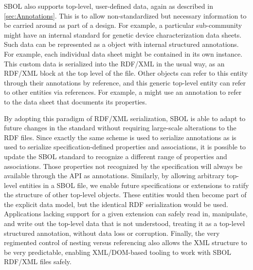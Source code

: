 SBOL also supports top-level, user-defined data, again as described in \ref{sec:Annotations}. This is to allow non-standardized but necessary information to be carried around as part of a design. For example, a particular sub-community might have an internal standard for genetic device characterization data sheets. 
Such data can be represented as a  object with internal structured annotations. 
For example, each individual data sheet might be contained in its own  instance.
This custom data is serialized into the RDF/XML in the usual way, as an RDF/XML block at the top level of the file. 
Other objects can refer to this entity through their annotations by reference, and this generic top-level entity can refer to other entities via references.
For example, a  might use an annotation to refer to the data sheet  that documents its properties.

By adopting this paradigm of RDF/XML serialization, SBOL is able to adapt to future changes in the standard without requiring large-scale alterations to the RDF files. Since exactly the same scheme is used to serialize annotations as is used to serialize specification-defined properties and associations, it is possible to update the SBOL standard to recognize a different range of properties and associations. Those properties not recognized by the specification will always be available through the API as annotations. Similarly, by allowing arbitrary top-level entities in a SBOL file, we enable future specifications or extensions to ratify the structure of other top-level objects. These entities would then become part of the explicit data model, but the identical RDF serialization would be used. Applications lacking support for a given extension can safely read in, manipulate, and write out the top-level data that is not understood, treating it as a top-level structured annotation, without data loss or corruption. Finally, the very regimented control of nesting versus referencing also allows the XML structure to be very predictable, enabling XML/DOM-based tooling to work with SBOL RDF/XML files safely.
